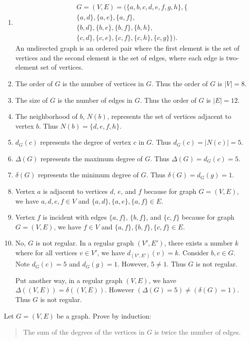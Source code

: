 \documentclass{article}
\theoremstyle{definition}
\begin{document}
\begin{solution}
\begin{enumerate}
\item\begin{align*}
G=(V,E)=(\{a,b,c,d,e,f,g,h\},\{\\
\{a,d\},\{a,e\},\{a,f\},\\
\{b,d\},\{b,e\},\{b,f\},\{b,h\},\\
\{c,d\},\{c,e\},\{c,f\},\{c,h\},\{c,g\}\}).
\end{align*} An undirected graph is an ordered pair where the first element is the set of vertices and the second element is the set of edges, where each edge is two-element set of vertices.
\item The order of $G$ is the number of vertices in $G$. Thus the order of $G$ is $|V|=8$.
\item The size of $G$ is the number of edges in $G$. Thus the order of $G$ is $|E|=12$.
\item The neighborhood of $b$, $N(b)$, represents the set of vertices adjacent to vertex $b$. Thus $N(b)=\{d,e,f,h\}$.
\item $d_G(c)$ represents the degree of vertex $c$ in $G$. Thus $d_G(c)=|N(c)|=5$.
\item $\Delta(G)$ represents the maximum degree of $G$. Thus $\Delta(G)=d_G(c)=5$.
\item $\delta(G)$ represents the minimum degree of $G$. Thus $\delta(G)=d_G(g)=1$.
\item Vertex $a$ is adjacent to vertices $d$, $e$, and $f$ because for graph $G=(V,E)$, we have $a,d,e,f\in V$ and $\{a,d\},\{a,e\},\{a,f\}\in E$.
\item Vertex $f$ is incident with edges $\{a,f\}$, $\{b,f\}$, and $\{c,f\}$ because for graph $G=(V,E)$, we have $f\in V$ and $\{a,f\},\{b,f\},\{c,f\}\in E$.
\item No, $G$ is not regular. In a regular graph $(V',E')$, there exists a number $k$ where for all vertices $v\in V'$, we have $d_{(V',E')}(v)=k$. Consider $b,c\in G$. Note $d_G(c)=5$ and $d_G(g)=1$. However, $5\neq 1$. Thus $G$ is not regular.

Put another way, in a regular graph $(V,E)$, we have $\Delta((V,E))=\delta((V,E))$. However $(\Delta(G)=5)\neq(\delta(G)=1)$. Thus $G$ is not regular.
\end{enumerate}
\end{solution}
\begin{question}
     Let $G=(V,E)$ be a graph. Prove by induction: 
\begin{quote}
The sum of the degrees of the vertices in $G$ is twice the number of edges.
\end{quote}	
\end{question}
\end{document}
